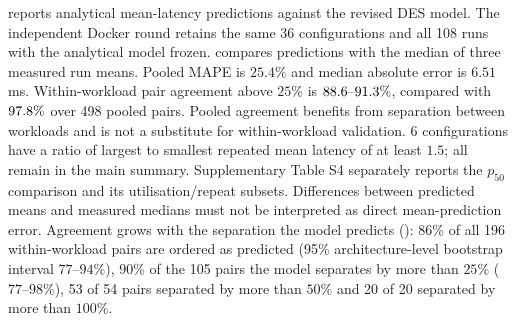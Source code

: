%
\RefDesTab{} reports analytical mean-latency predictions against the revised
DES model. The independent Docker round retains the same 36 configurations and all 108
runs with the analytical model frozen. \RefTestbedTab{} compares predictions with
the median of three measured run means. Pooled MAPE is $25.4\%$ and median absolute error is $6.51$\,ms. Within-workload pair agreement above $25\%$ is $88.6\text{--}91.3\%$, compared with $97.8\%$ over 498 pooled pairs. Pooled agreement benefits from separation between workloads and is not
a substitute for within-workload validation. 6 configurations have a ratio of largest to smallest repeated mean latency of at least
$1.5$; all remain in the main summary. Supplementary Table S4 separately reports the
$p_{50}$ comparison and its utilisation/repeat subsets. Differences between predicted
means and measured medians must not be interpreted as direct mean-prediction error.
Agreement grows with the separation the model predicts (\RefReliabilityFig{}): 86\% of all 196 within-workload pairs are ordered as predicted (95\% architecture-level bootstrap interval $77\text{--}94\%$), 90\% of the 105 pairs the model separates by more than $25\%$ ($77\text{--}98\%$), 53 of 54 pairs separated by more than $50\%$ and 20 of 20 separated by more than $100\%$.
